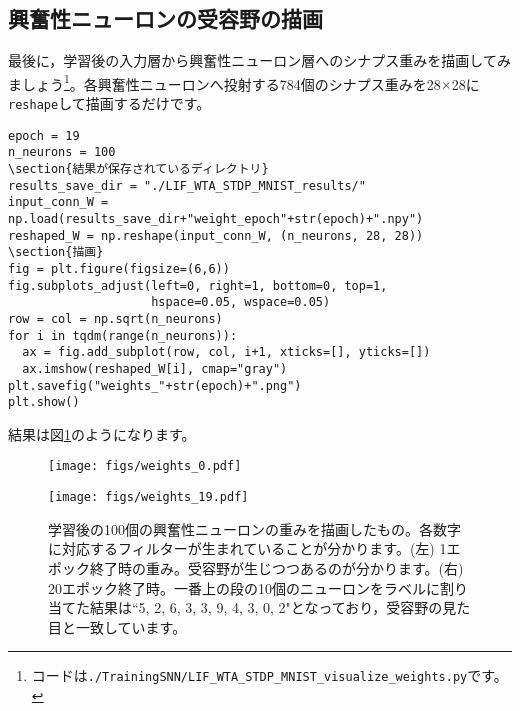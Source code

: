 \subsection{興奮性ニューロンの受容野の描画}
最後に，学習後の入力層から興奮性ニューロン層へのシナプス重みを描画してみましょう\footnote{コードは\texttt{./TrainingSNN/LIF\_WTA\_STDP\_MNIST\_visualize\_weights.py}です。}。各興奮性ニューロンへ投射する784個のシナプス重みを28$\times$28に\texttt{reshape}して描画するだけです。
\begin{verbatim}
epoch = 19
n_neurons = 100
\section{結果が保存されているディレクトリ}
results_save_dir = "./LIF_WTA_STDP_MNIST_results/"
input_conn_W = np.load(results_save_dir+"weight_epoch"+str(epoch)+".npy")
reshaped_W = np.reshape(input_conn_W, (n_neurons, 28, 28))
\section{描画}
fig = plt.figure(figsize=(6,6))
fig.subplots_adjust(left=0, right=1, bottom=0, top=1,
                    hspace=0.05, wspace=0.05)
row = col = np.sqrt(n_neurons)
for i in tqdm(range(n_neurons)):
  ax = fig.add_subplot(row, col, i+1, xticks=[], yticks=[])
  ax.imshow(reshaped_W[i], cmap="gray")
plt.savefig("weights_"+str(epoch)+".png")
plt.show()
\end{verbatim}
結果は図\ref{fig:Diehl_weights}のようになります。
\begin{figure}[htbp]
 \begin{minipage}{0.5\hsize}
  \begin{center}
   \texttt{[image: figs/weights\_0.pdf]}
  \end{center}
 \end{minipage}
 \begin{minipage}{0.5\hsize}
  \begin{center}
   \texttt{[image: figs/weights\_19.pdf]}
  \end{center}
 \end{minipage}
\caption{学習後の100個の興奮性ニューロンの重みを描画したもの。各数字に対応するフィルターが生まれていることが分かります。(左) 1エポック終了時の重み。受容野が生じつつあるのが分かります。(右) 20エポック終了時。一番上の段の10個のニューロンをラベルに割り当てた結果は``5, 2, 6, 3, 3, 9, 4, 3, 0, 2"となっており，受容野の見た目と一致しています。}
\label{fig:Diehl_weights}
\end{figure}

